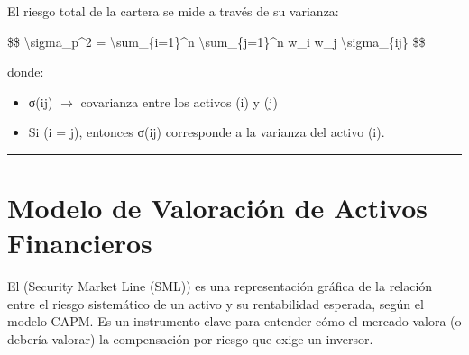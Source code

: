 \documentclass[letterpaper,10pt,spanish]{sphinxmanual}
\begin{document}
\sphinxAtStartPar
El riesgo total de la cartera se mide a través de su varianza:

\sphinxAtStartPar
\$\$
\textbackslash{}sigma\_p\textasciicircum{}2 = \textbackslash{}sum\_\{i=1\}\textasciicircum{}n \textbackslash{}sum\_\{j=1\}\textasciicircum{}n w\_i w\_j \textbackslash{}sigma\_\{ij\}
\$\$

\sphinxAtStartPar
donde:
\begin{itemize}
\item {} 
\sphinxAtStartPar
σ(ij) \(\rightarrow\) covarianza entre los activos (i) y (j)

\item {} 
\sphinxAtStartPar
Si (i = j), entonces σ(ij) corresponde a la varianza del activo (i).

\end{itemize}


\bigskip\hrule\bigskip



\section{Modelo de Valoración de Activos Financieros}
\label{\detokenize{MarcoTeorico:modelo-de-valoracion-de-activos-financieros}}
\sphinxAtStartPar
El  (Security Market Line (SML)) es una representación gráfica de la relación entre el riesgo sistemático de un activo y su rentabilidad esperada, según el modelo CAPM. Es un instrumento clave para entender cómo el mercado valora (o debería valorar) la compensación por riesgo que exige un inversor.
\end{document}
